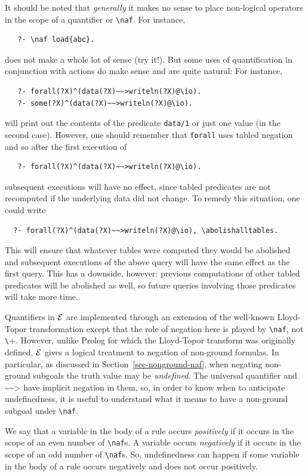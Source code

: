 \documentclass[11pt]{article}
\newcommand{\ERGO}{\mbox{\ensuremath{\cal{E}}\smaller{{\sc{RGO}}}}\xspace}
\newcommand{\FLSYSTEM}{\ERGO}
\newcommand{\rnafarr}{\texttt{\textasciitilde\textasciitilde>}}
\newcommand{\bs}{\textbackslash}
\newcommand{\PLGNAF}{\mbox{\texttt{\bs}+}\xspace}
\newcommand{\RULELOGNAF}{{\texttt{{\bs}naf}}\xspace}
\begin{document}
It should be noted that \emph{generally}   it makes no
sense to place non-logical operators in the scope of a quantifier or
\texttt{\RULELOGNAF}. For instance,
\begin{verbatim}
   ?- \naf load{abc}.
\end{verbatim}
does not make a whole lot of sense (try it!). But some uses of
quantification in conjunction with actions do make sense and are quite natural:
For instance,
\begin{verbatim}
   ?- forall(?X)^(data(?X)~~>writeln(?X)@\io).
   ?- some(?X)^(data(?X)~~>writeln(?X)@\io).
\end{verbatim}
will print out the contents of the predicate \texttt{data/1} or just one
value (in the second case).
However, one should remember that \texttt{forall} uses tabled negation and
so after the first execution of
\begin{verbatim}
   ?- forall(?X)^(data(?X)~~>writeln(?X)@\io).
\end{verbatim}
subsequent executions will have no effect, since tabled predicates are not
recomputed if the underlying data did not change. To remedy this situation,
one could write
\index{\bs{}abolishalltables}
\begin{verbatim}
  ?- forall(?X)^(data(?X)~~>writeln(?X)@\io), \abolishalltables.
\end{verbatim}
This will ensure that whatever tables were computed they would be abolished
and subsequent executions of the above query will have the same effect as
the first query. This has a downside, however: previous computations
of other tabled predicates will be abolished as well, so future queries
involving those predicates will take more time.

Quantifiers in \FLSYSTEM are implemented through an extension of
the well-known Lloyd-Topor
transformation \cite{Lloy84} except that the role of negation here is
played by \texttt{\RULELOGNAF}, not \PLGNAF. However, unlike Prolog for which the
Lloyd-Topor transform was originally defined, \FLSYSTEM gives a
logical treatment to negation of non-ground formulas. In particular, as
discussed in Section~\ref{sec-nonground-naf}, when
negating non-ground subgoals the truth value may be \emph{undefined}.
The universal quantifier and $\rnafarr$ have implicit negation in them, so, in order to
know when to anticipate undefinedness, it is useful
to understand what it means to have a non-ground subgoal under
\texttt{\RULELOGNAF}. 

We say that a variable in the body of a rule occurs \emph{positively} if it
occurs in the scope of an even number of  \texttt{\RULELOGNAF}s. A variable occurs
\emph{negatively} if it occurs in the scope of an odd number of
\texttt{\RULELOGNAF}s.  
So, undefinedness can happen if some variable in the body of a rule occurs
negatively and does not occur positively.
\end{document}
